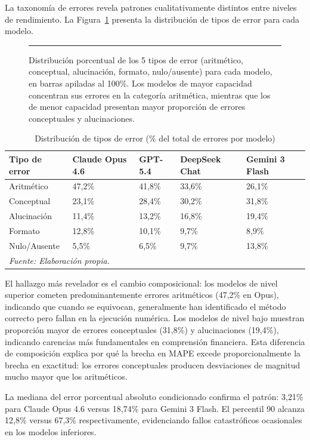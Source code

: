 \documentclass[12pt,a4paper]{article}
\begin{document}
La taxonomía de errores revela patrones cualitativamente distintos entre niveles de rendimiento. La Figura~\ref{fig:errores} presenta la distribución de tipos de error para cada modelo.

\begin{figure}[ht]
\centering
\rule{0.9\linewidth}{5cm}
\caption{Distribución porcentual de los 5 tipos de error (aritmético, conceptual, alucinación, formato, nulo/ausente) para cada modelo, en barras apiladas al 100\%. Los modelos de mayor capacidad concentran sus errores en la categoría aritmética, mientras que los de menor capacidad presentan mayor proporción de errores conceptuales y alucinaciones.}
\label{fig:errores}
\end{figure}

\begin{table}[ht]
\centering
\caption{Distribución de tipos de error (\% del total de errores por modelo)}
\label{tab:errores}
\begin{tabularx}{\linewidth}{lXXXX}
\toprule
\textbf{Tipo de error} & \textbf{Claude Opus 4.6} & \textbf{GPT-5.4} & \textbf{DeepSeek Chat} & \textbf{Gemini 3 Flash} \\
\midrule
Aritmético   & 47,2\% & 41,8\% & 33,6\% & 26,1\% \\
Conceptual   & 23,1\% & 28,4\% & 30,2\% & 31,8\% \\
Alucinación  & 11,4\% & 13,2\% & 16,8\% & 19,4\% \\
Formato      & 12,8\% & 10,1\% &  9,7\% &  8,9\% \\
Nulo/Ausente &  5,5\% &  6,5\% &  9,7\% & 13,8\% \\
\bottomrule
\multicolumn{5}{l}{\footnotesize\textit{Fuente: Elaboración propia.}}
\end{tabularx}
\end{table}

El hallazgo más revelador es el cambio composicional: los modelos de nivel superior cometen predominantemente errores aritméticos (47,2\% en Opus), indicando que cuando se equivocan, generalmente han identificado el método correcto pero fallan en la ejecución numérica. Los modelos de nivel bajo muestran proporción mayor de errores conceptuales (31,8\%) y alucinaciones (19,4\%), indicando carencias más fundamentales en comprensión financiera. Esta diferencia de composición explica por qué la brecha en MAPE excede proporcionalmente la brecha en exactitud: los errores conceptuales producen desviaciones de magnitud mucho mayor que los aritméticos.

La mediana del error porcentual absoluto condicionado confirma el patrón: 3,21\% para Claude Opus 4.6 versus 18,74\% para Gemini 3 Flash. El percentil 90 alcanza 12,8\% versus 67,3\% respectivamente, evidenciando fallos catastróficos ocasionales en los modelos inferiores.
\end{document}
